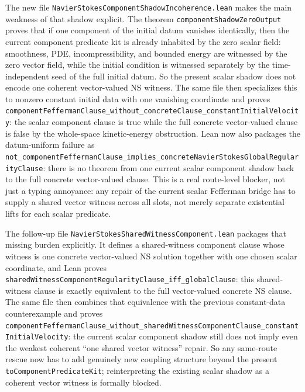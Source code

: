 \documentclass[11pt]{article}
\begin{document}
The new file \texttt{NavierStokesComponentShadowIncoherence.lean} makes the
main weakness of that shadow explicit.  The theorem
\texttt{componentShadowZeroOutput} proves that if one component of the initial
datum vanishes identically, then the current component predicate kit is already
inhabited by the zero scalar field: smoothness, PDE, incompressibility, and
bounded energy are witnessed by the zero vector field, while the initial
condition is witnessed separately by the time-independent seed of the full
initial datum.  So the present scalar shadow does not encode one coherent
vector-valued NS witness.  The same file then specializes this to nonzero
constant initial data with one vanishing coordinate and proves
\texttt{componentFeffermanClause\_without\_concreteClause\_constantInitialVelocity}:
the scalar component clause is true while the full concrete vector-valued
clause is false by the whole-space kinetic-energy obstruction.  Lean now also
packages the datum-uniform failure as
\texttt{not\_componentFeffermanClause\_implies\_concreteNavierStokesGlobalRegularityClause}:
there is no theorem from one current scalar component shadow back to the full
concrete vector-valued clause.  This is a real route-level blocker, not just a
typing annoyance: any repair of the current scalar Fefferman bridge has to
supply a shared vector witness across all slots, not merely separate existential
lifts for each scalar predicate.

The follow-up file \texttt{NavierStokesSharedWitnessComponent.lean} packages
that missing burden explicitly.  It defines a shared-witness component clause
whose witness is one concrete vector-valued NS solution together with one chosen
scalar coordinate, and Lean proves
\texttt{sharedWitnessComponentRegularityClause\_iff\_globalClause}: this
shared-witness clause is exactly equivalent to the full vector-valued concrete
NS clause.  The same file then combines that equivalence with the previous
constant-data counterexample and proves
\texttt{componentFeffermanClause\_without\_sharedWitnessComponentClause\_constantInitialVelocity}:
the current scalar component shadow still does not imply even the weakest
coherent ``one shared vector witness'' repair.  So any same-route rescue now
has to add genuinely new coupling structure beyond the present
\texttt{toComponentPredicateKit}; reinterpreting the existing scalar shadow as a
coherent vector witness is formally blocked.
\end{document}
